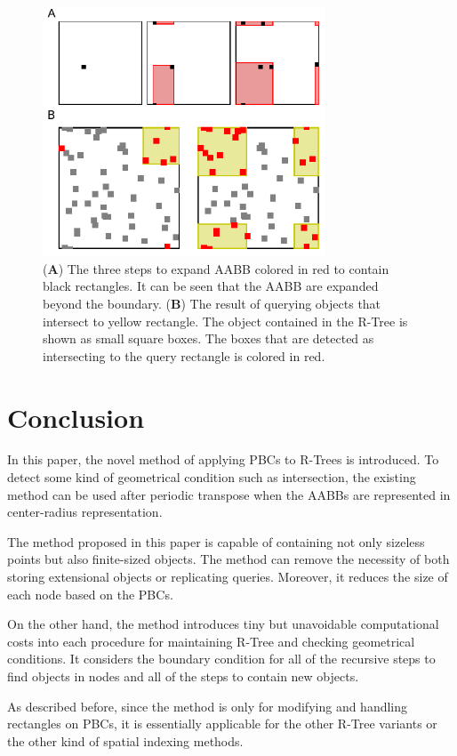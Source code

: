 \documentclass[10pt,letterpaper,twocolumn]{article}
\begin{document}
\begin{figure}[htb]
    \includegraphics[width=8.4cm, bb=4 6 237 212]{fig-result-expand-intersect.eps}
    \caption{
    (\textbf{A})
    The three steps to expand AABB colored in red to contain black rectangles.
    It can be seen that the AABB are expanded beyond the boundary.
    (\textbf{B})
    The result of querying objects that intersect to yellow rectangle.
    The object contained in the R-Tree is shown as small square boxes.
    The boxes that are detected as intersecting to the query rectangle is
    colored in red.
    }
    \label{fig-result}
\end{figure}

\section*{Conclusion}

In this paper, the novel method of applying PBCs to R-Trees is introduced.
To detect some kind of geometrical condition such as intersection, the existing
method can be used after periodic transpose when the AABBs are represented
in center-radius representation.

The method proposed in this paper is capable of containing not only sizeless points but also finite-sized objects. The method can remove the necessity of both storing extensional objects or replicating queries. Moreover, it reduces the
size of each node based on the PBCs.

On the other hand, the method introduces tiny but unavoidable computational
costs into each procedure for maintaining R-Tree and checking geometrical
conditions. It considers the boundary condition for all of the recursive steps
to find objects in nodes and all of the steps to contain new objects.

As described before, since the method is only for modifying and handling
rectangles on PBCs, it is essentially applicable for the other R-Tree variants
or the other kind of spatial indexing methods.
\end{document}
